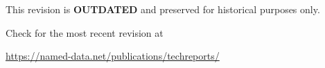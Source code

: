 \documentclass[10pt]{article}
\begin{document}
\pagestyle{headings}
\hspace{0pt}
\vfill
\Large
{
\centering
This revision is {\bf OUTDATED} and preserved for historical purposes only.

\vspace{1cm}

\centering
Check for the most recent revision at

\url{https://named-data.net/publications/techreports/}
}
\vfill
\hspace{0pt}
\pagebreak


\end{document}
